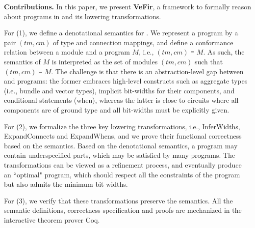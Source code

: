 \smallskip
\noindent
{\bf Contributions.} In this paper, we present \textbf{VeFir}, a framework to formally reason about programs in {\firrtl} and its lowering transformations.

For (1), we define a denotational semantics for \hifirrtl.
We represent a {\lofirrtl} program by a pair $(tm, cm)$ of type and connection mappings, and define a conformance relation between a {\lofirrtl} module and a {\hifirrtl} program $M$, i.e., $(tm, cm)\models M$.
As such, the semantics of $M$ is interpreted as the set of {\lofirrtl} modules $(tm,cm)$ such that $(tm, cm)\models M$.
The challenge is that there is an abstraction-level gap between {\hifirrtl} and {\lofirrtl} programs:
the former embraces high-level constructs such as aggregate types (i.e., bundle and vector types), implicit bit-widths for their components, and conditional statements (when),
whereas the latter is close to circuits where all components are of ground type and all bit-widths must be explicitly given.


For (2), we formalize the three key lowering transformations, i.e., InferWidths, ExpandConnects and ExpandWhens,
and we prove their functional correctness based on the semantics.
Based on the denotational semantics, a {\hifirrtl} program may contain underspecified parts, which may be satisfied by many {\lofirrtl} programs.
The transformations can be viewed as a refinement process, and eventually produce an ``optimal" {\lofirrtl} program, which should respect all the constraints of the {\hifirrtl} program but also admits the minimum bit-widths.


For (3), we verify that these transformations preserve the semantics.
All the semantic definitions, correctness specification and proofs are mechanized in
the interactive theorem prover Coq.

